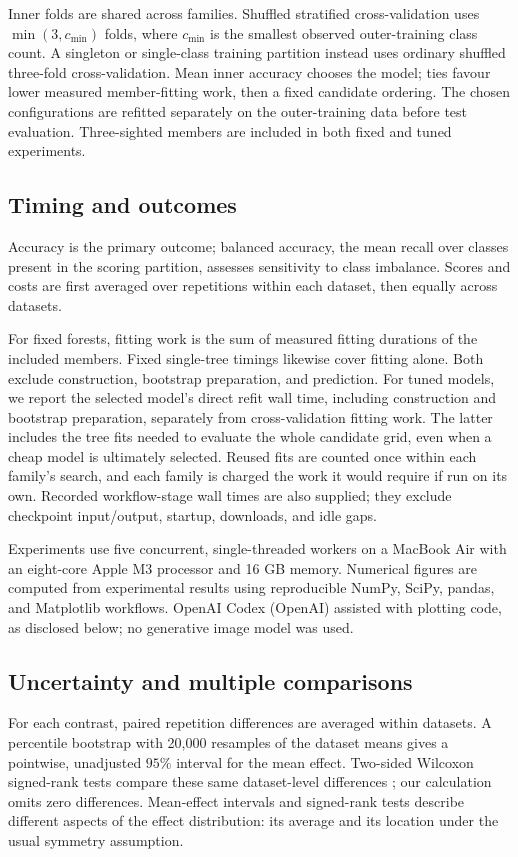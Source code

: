 \documentclass[final,5p,times]{elsarticle}
\begin{document}
Inner folds are shared across families. Shuffled stratified cross-validation uses $\min(3,c_{\min})$ folds, where $c_{\min}$ is the smallest observed outer-training class count. A singleton or single-class training partition instead uses ordinary shuffled three-fold cross-validation. Mean inner accuracy chooses the model; ties favour lower measured member-fitting work, then a fixed candidate ordering. The chosen configurations are refitted separately on the outer-training data before test evaluation. Three-sighted members are included in both fixed and tuned experiments.

\subsection{Timing and outcomes}
Accuracy is the primary outcome; balanced accuracy, the mean recall over classes present in the scoring partition, assesses sensitivity to class imbalance. Scores and costs are first averaged over repetitions within each dataset, then equally across datasets.

For fixed forests, fitting work is the sum of measured fitting durations of the included members. Fixed single-tree timings likewise cover fitting alone. Both exclude construction, bootstrap preparation, and prediction. For tuned models, we report the selected model's direct refit wall time, including construction and bootstrap preparation, separately from cross-validation fitting work. The latter includes the tree fits needed to evaluate the whole candidate grid, even when a cheap model is ultimately selected. Reused fits are counted once within each family's search, and each family is charged the work it would require if run on its own. Recorded workflow-stage wall times are also supplied; they exclude checkpoint input/output, startup, downloads, and idle gaps.

Experiments use five concurrent, single-threaded workers on a MacBook Air with an eight-core Apple M3 processor and 16 GB memory. Numerical figures are computed from experimental results using reproducible NumPy, SciPy, pandas, and Matplotlib workflows. OpenAI Codex (OpenAI) assisted with plotting code, as disclosed below; no generative image model was used.

\subsection{Uncertainty and multiple comparisons}
For each contrast, paired repetition differences are averaged within datasets. A percentile bootstrap with 20,000 resamples of the dataset means gives a pointwise, unadjusted $95\%$ interval for the mean effect. Two-sided Wilcoxon signed-rank tests compare these same dataset-level differences \cite{demsar2006comparisons}; our calculation omits zero differences. Mean-effect intervals and signed-rank tests describe different aspects of the effect distribution: its average and its location under the usual symmetry assumption.
\end{document}
